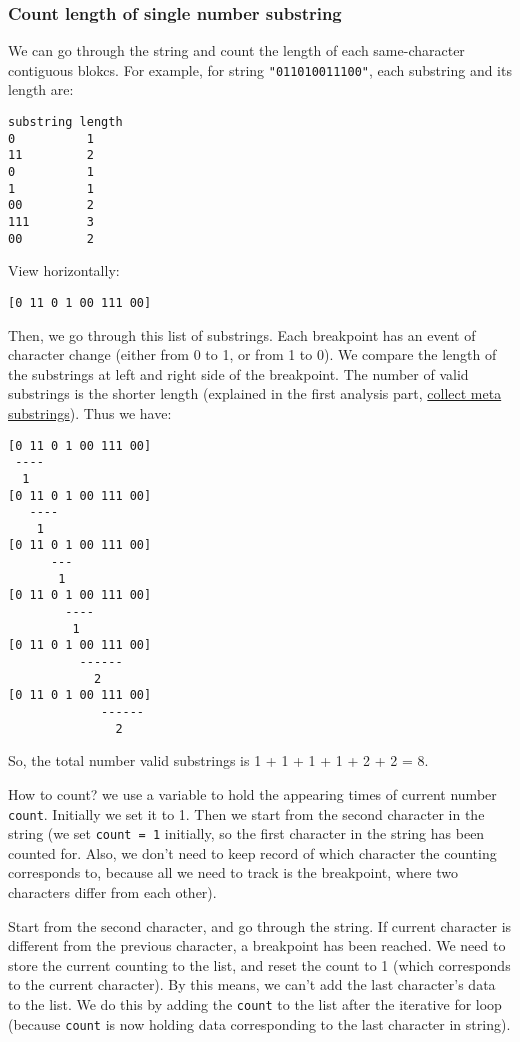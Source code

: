 \documentclass[12pt]{article}
\begin{document}
\subsubsection{Count length of single number substring}
\label{sec:org98ee2b1}
We can go through the string and count the length of each same-character contiguous blokcs. For example, for string \texttt{"011010011100"}, each substring and its length are:
\begin{verbatim}
substring length
0          1
11         2
0          1
1          1
00         2
111        3
00         2
\end{verbatim}
View horizontally:
\begin{verbatim}
[0 11 0 1 00 111 00]
\end{verbatim}
Then, we go through this list of substrings. Each breakpoint has an event of character change (either from 0 to 1, or from 1 to 0). We compare the length of the substrings at left and right side of the breakpoint. The number of valid substrings is the shorter length (explained in the first analysis part, \hyperref[orgada03b0]{collect meta substrings}). Thus we have:
\begin{verbatim}
[0 11 0 1 00 111 00]
 ----
  1
[0 11 0 1 00 111 00]
   ----
    1
[0 11 0 1 00 111 00]
      ---
       1
[0 11 0 1 00 111 00]
        ----
         1
[0 11 0 1 00 111 00]
          ------
            2
[0 11 0 1 00 111 00]
             ------
               2
\end{verbatim}
So, the total number valid substrings is 1 + 1 + 1 + 1 + 2 + 2 = 8.

How to count? we use a variable to hold the appearing times of current number \texttt{count}. Initially we set it to 1. Then we start from the second character in the string (we set \texttt{count = 1} initially, so the first character in the string has been counted for. Also, we don't need to keep record of which character the counting corresponds to, because all we need to track is the breakpoint, where two characters differ from each other).

Start from the second character, and go through the string. If current character is different from the previous character, a breakpoint has been reached. We need to store the current counting to the list, and reset the count to 1 (which corresponds to the current character). By this means, we can't add the last character's data to the list. We do this by adding the \texttt{count} to the list after the iterative for loop (because \texttt{count} is now holding data corresponding to the last character in string).
\end{document}
